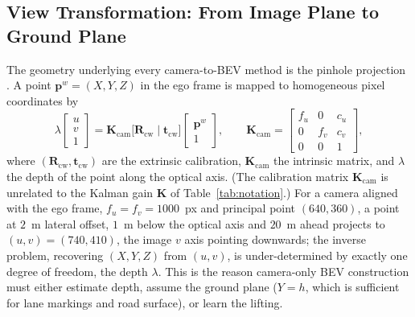 \subsection{View Transformation: From Image Plane to Ground Plane}
\label{subsec:view-transformation}
The geometry underlying every camera-to-BEV method is the pinhole projection \cite{hartley2003_mvg}. A point $\mathbf{p}^{w}=(X,Y,Z)$ in the ego frame is mapped to homogeneous pixel coordinates by
\begin{equation}
\lambda\begin{bmatrix}u\\ v\\ 1\end{bmatrix}
=\mathbf{K}_{\mathrm{cam}}\big[\mathbf{R}_{\mathrm{cw}}\;|\;\mathbf{t}_{\mathrm{cw}}\big]
\begin{bmatrix}\mathbf{p}^{w}\\ 1\end{bmatrix},\qquad
\mathbf{K}_{\mathrm{cam}}=\begin{bmatrix}f_u & 0 & c_u\\ 0 & f_v & c_v\\ 0&0&1\end{bmatrix},
\label{eq:pinhole}
\end{equation}
where $(\mathbf{R}_{\mathrm{cw}},\mathbf{t}_{\mathrm{cw}})$ are the extrinsic calibration, $\mathbf{K}_{\mathrm{cam}}$ the intrinsic matrix, and $\lambda$ the depth of the point along the optical axis. (The calibration matrix $\mathbf{K}_{\mathrm{cam}}$ is unrelated to the Kalman gain $\mathbf{K}$ of Table~\ref{tab:notation}.) For a camera aligned with the ego frame, $f_u=f_v=1000$~px and principal point $(640,360)$, a point at $2$~m lateral offset, $1$~m below the optical axis and $20$~m ahead projects to $(u,v)=(740,410)$, the image $v$ axis pointing downwards; the inverse problem, recovering $(X,Y,Z)$ from $(u,v)$, is under-determined by exactly one degree of freedom, the depth $\lambda$. This is the reason camera-only BEV construction must either estimate depth, assume the ground plane ($Y=h$, which is sufficient for lane markings and road surface), or learn the lifting.

